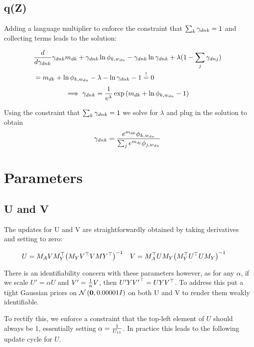 \subsection{q(Z)}
Adding a language multiplier to enforce the constraint that $\sum_k { \gamma_{dnk} } = 1$ and collecting terms leads to the solution:

\begin{align}
& \frac{d}{d { \gamma_{dnk} }} { \gamma_{dnk} } m_{dk} + { \gamma_{dnk} } \ln \phi_{k,w_{dn}} - { \gamma_{dnk} } \ln { \gamma_{dnk} } + \lambda (1 - \sum_j \gamma_{dnj}) \\
& = m_{dk} + \ln \phi_{k,w_{dn}} -\lambda - \ln { \gamma_{dnk} } - 1 \overset{!}{=} 0
\end{align}
\begin{align}
\implies { \gamma_{dnk} } = \frac{1}{ {e^\lambda} } \exp\left(m_{dk} + \ln \phi_{k,{w_{dn}}} -1 \right)
\end{align}

Using the constraint that $\sum_k { \gamma_{dnk} } = 1$ we solve for $\lambda$ and plug in the solution to obtain
\begin{align}
{ \gamma_{dnk} } = \frac{e^{m_{dk}} \phi_{k,w_{dn}}}{\sum_j e^{m_{dj}} \phi_{j,w_{dn}}} \label{eqn:app-zdnk-update}
\end{align}

\section{Parameters}
\subsection{U and V}
The updates for U and V are straightforwardly obtained by taking derivatives and setting to zero:

\begin{align}
U & = M_A V M_Y^\top {\left( M_Y V ^\top V MY ^\top \right)}^{-1} &
V & = M_A^\top U M_Y {\left( M_Y^\top U^\top U M_Y \right)}^{-1} \label{eqn:app-v-update}
\end{align}

There is an identifiability concern with these parameters however, as for any $\alpha$, if we scale $U' = \alpha U$ and $V' = \frac{1}{ {\alpha} } V$, then $U'Y{V'}^\top = U Y V^\top$. To address this put a tight Gaussian priors on $\mathcal{N} \left( {\bm 0}, {0.00001 I} \right)$ on both U and V to render them weakly identifiable.

To rectify this, we enforce a constraint that the top-left element of $U$ should always be 1, essentially setting $\alpha = \frac{1}{ {U_{11}} }$. In practice this leads to the following update cycle for $U$.

